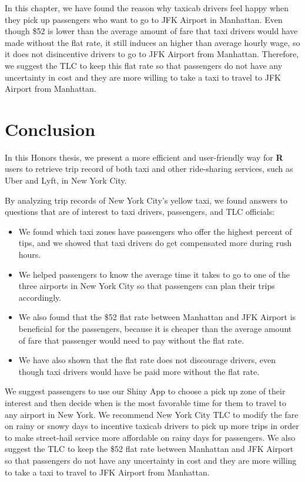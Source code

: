 \documentclass[12pt,twoside]{reedthesis}
\theoremstyle{definition}
\theoremstyle{definition}
\theoremstyle{definition}
\theoremstyle{remark}
\begin{document}
In this chapter, we have found the reason why taxicab drivers feel happy
when they pick up passengers who want to go to JFK Airport in Manhattan.
Even though \$52 is lower than the average amount of fare that taxi
drivers would have made without the flat rate, it still induces an
higher than average hourly wage, so it does not disincentive drivers to
go to JFK Airport from Manhattan. Therefore, we suggest the TLC to keep
this flat rate so that passengers do not have any uncertainty in cost
and they are more willing to take a taxi to travel to JFK Airport from
Manhattan.

\chapter{Conclusion}\label{chapter6}

In this Honors thesis, we present a more efficient and user-friendly way
for \textbf{R} users to retrieve trip record of both taxi and other
ride-sharing services, such as Uber and Lyft, in New York City.

By analyzing trip records of New York City's yellow taxi, we found
answers to questions that are of interest to taxi drivers, passengers,
and TLC officials:
\begin{itemize}
\item
  We found which taxi zones have passengers who offer the highest
  percent of tips, and we showed that taxi drivers do get compensated
  more during rush hours.
\item
  We helped passengers to know the average time it takes to go to one of
  the three airports in New York City so that passengers can plan their
  trips accordingly.
\item
  We also found that the \$52 flat rate between Manhattan and JFK
  Airport is beneficial for the passengers, because it is cheaper than
  the average amount of fare that passenger would need to pay without
  the flat rate.
\item
  We have also shown that the flat rate does not discourage drivers,
  even though taxi drivers would have be paid more without the flat
  rate.
\end{itemize}
We suggest passengers to use our Shiny App to choose a pick up zone of
their interest and then decide when is the most favorable time for them
to travel to any airport in New York. We recommend New York City TLC to
modify the fare on rainy or snowy days to incentive taxicab drivers to
pick up more trips in order to make street-hail service more affordable
on rainy days for passengers. We also suggest the TLC to keep the \$52
flat rate between Manhattan and JFK Airport so that passengers do not
have any uncertainty in cost and they are more willing to take a taxi to
travel to JFK Airport from Manhattan.
\end{document}
